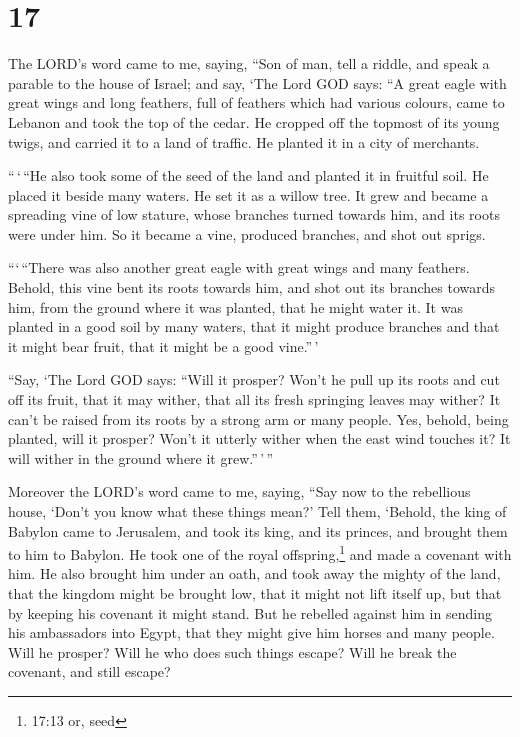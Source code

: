 \hypertarget{section-15}{%
\section{17}\label{section-15}}

 The LORD's word came to me, saying,  ``Son of
man, tell a riddle, and speak a parable to the house of Israel;
 and say, `The Lord GOD says: ``A great eagle with great
wings and long feathers, full of feathers which had various colours,
came to Lebanon and took the top of the cedar.  He cropped
off the topmost of its young twigs, and carried it to a land of traffic.
He planted it in a city of merchants.

 ``\,`\,``He also took some of the seed of the land and
planted it in fruitful soil. He placed it beside many waters. He set it
as a willow tree.  It grew and became a spreading vine of
low stature, whose branches turned towards him, and its roots were under
him. So it became a vine, produced branches, and shot out sprigs.

 ```\,``There was also another great eagle with great wings
and many feathers. Behold, this vine bent its roots towards him, and
shot out its branches towards him, from the ground where it was planted,
that he might water it.  It was planted in a good soil by
many waters, that it might produce branches and that it might bear
fruit, that it might be a good vine.''\,'

 ``Say, `The Lord GOD says: ``Will it prosper? Won't he pull
up its roots and cut off its fruit, that it may wither, that all its
fresh springing leaves may wither? It can't be raised from its roots by
a strong arm or many people.  Yes, behold, being planted,
will it prosper? Won't it utterly wither when the east wind touches it?
It will wither in the ground where it grew.''\,'\,''

 Moreover the LORD's word came to me, saying, 
``Say now to the rebellious house, `Don't you know what these things
mean?' Tell them, `Behold, the king of Babylon came to Jerusalem, and
took its king, and its princes, and brought them to him to Babylon.
 He took one of the royal offspring,\footnote{17:13 or,
  seed} and made a covenant with him. He also brought him under an oath,
and took away the mighty of the land,  that the kingdom
might be brought low, that it might not lift itself up, but that by
keeping his covenant it might stand.  But he rebelled
against him in sending his ambassadors into Egypt, that they might give
him horses and many people. Will he prosper? Will he who does such
things escape? Will he break the covenant, and still escape?

